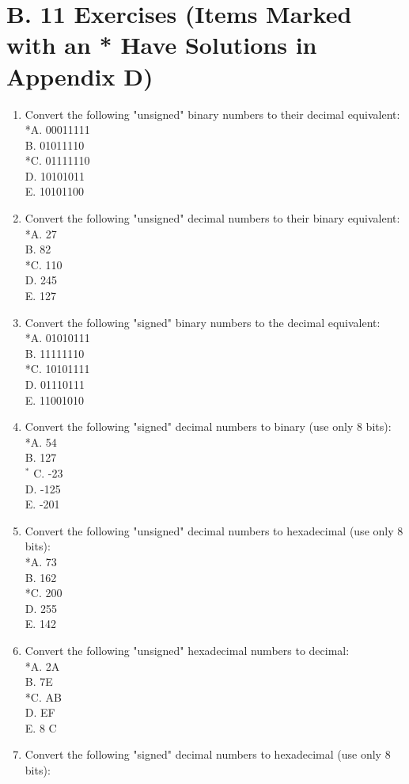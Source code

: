 \documentclass[10pt]{book}
\begin{document}
\section*{B. 11 Exercises (Items Marked with an * Have Solutions in Appendix D)}
\begin{enumerate}
  \item Convert the following "unsigned" binary numbers to their decimal equivalent:\\
*A. 00011111\\
B. 01011110\\
*C. 01111110\\
D. 10101011\\
E. 10101100
  \item Convert the following "unsigned" decimal numbers to their binary equivalent:\\
*A. 27\\
B. 82\\
*C. 110\\
D. 245\\
E. 127
  \item Convert the following "signed" binary numbers to the decimal equivalent:\\
*A. 01010111\\
B. 11111110\\
*C. 10101111\\
D. 01110111\\
E. 11001010
  \item Convert the following "signed" decimal numbers to binary (use only 8 bits):\\
*A. 54\\
B. 127\\
${ }^{*}$ C. -23\\
D. -125\\
E. -201
  \item Convert the following "unsigned" decimal numbers to hexadecimal (use only 8 bits):\\
*A. 73\\
B. 162\\
*C. 200\\
D. 255\\
E. 142
  \item Convert the following "unsigned" hexadecimal numbers to decimal:\\
*A. 2A\\
B. 7E\\
*C. AB\\
D. EF\\
E. 8 C
  \item Convert the following "signed" decimal numbers to hexadecimal (use only 8 bits):\\

\end{enumerate}
\end{document}
